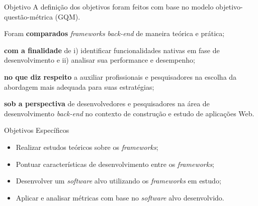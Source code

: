 \documentclass{libs/ufc_format}
\begin{document}
\begin{frame}{Objetivo}
    A definição dos objetivos foram feitos com base no modelo objetivo-questão-métrica (GQM)\nocite{6156}\let\thefootnote\relax{}.

    Foram \textbf{comparados} \textit{frameworks} \textit{back-end} de maneira teórica e prática; 

    \textbf{com a finalidade} de i) identificar funcionalidades nativas em fase de desenvolvimento e ii) analisar sua performance e desempenho;

    \textbf{no que diz respeito} a auxiliar profissionais e pesquisadores na escolha da abordagem mais adequada para suas estratégias;

    \textbf{sob a perspectiva} de desenvolvedores e pesquisadores na área de desenvolvimento \textit{back-end} no contexto de construção e estudo de aplicações Web.
\end{frame}


\begin{frame}{Objetivos Específicos}
     \begin{itemize}
        \item Realizar estudos teóricos sobre os \textit{frameworks};
        \vspace*{0.5em}
        \item Pontuar características de desenvolvimento entre os \textit{frameworks};
        \vspace*{0.5em}
        \item Desenvolver um \textit{software} alvo utilizando os \textit{frameworks} em estudo;
        \vspace*{0.5em}
        \item Aplicar e analisar métricas com base no \textit{software} alvo desenvolvido.
    \end{itemize}
\end{frame}
\end{document}
